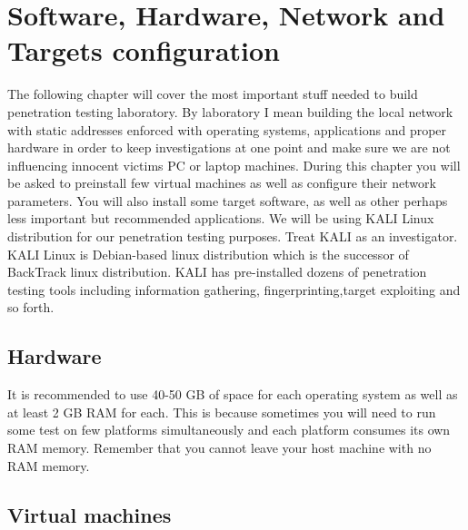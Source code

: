 \documentclass{article}[12pt]
\begin{document}
\section{Software, Hardware, Network and Targets configuration}
The following chapter will cover the most important stuff needed to build penetration testing laboratory.
By laboratory I mean building the local network with static addresses enforced with operating systems, applications and proper hardware in order to keep
investigations at one point and make sure we are not influencing innocent victims PC or laptop machines.
During this chapter you will be asked to preinstall few virtual machines as well as configure their network parameters.
You will also install some target software, as well as other perhaps less important but recommended applications.
We will be using KALI Linux distribution for our penetration testing purposes.
Treat KALI as an investigator.
KALI Linux is Debian-based linux distribution which is the successor of BackTrack linux distribution.
KALI has pre-installed  dozens of penetration testing tools including information gathering, fingerprinting,target exploiting and so forth.
\subsection{Hardware}
It is recommended to use 40-50 GB of space for each operating system as well as at least 2 GB RAM for each.
This is because sometimes you will need to
run some test on few platforms simultaneously and each platform consumes its own RAM memory.
Remember that you cannot leave your host machine with no RAM memory.
\subsection{Virtual machines}
\end{document}
